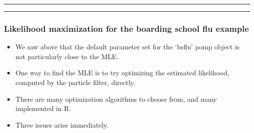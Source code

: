 \documentclass[]{article}
\begin{document}
\begin{center}\rule{0.5\linewidth}{\linethickness}\end{center}

\begin{center}\rule{0.5\linewidth}{\linethickness}\end{center}

\subsubsection{Likelihood maximization for the boarding school flu
example}\label{likelihood-maximization-for-the-boarding-school-flu-example}

\begin{itemize}
\item
  We saw above that the default parameter set for the `bsflu' pomp
  object is not particularly close to the MLE.
\item
  One way to find the MLE is to try optimizing the estimated likelihood,
  computed by the particle filter, directly.
\item
  There are many optimization algorithms to choose from, and many
  implemented in R.
\item
  Three issues arise immediately.
\end{itemize}
\end{document}
